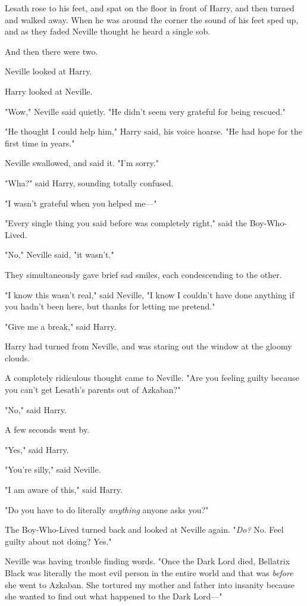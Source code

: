 Lesath rose to his feet, and spat on the floor in front of Harry, and then
turned and walked away. When he was around the corner the sound of his feet
sped up, and as they faded Neville thought he heard a single sob.

And then there were two.

Neville looked at Harry.

Harry looked at Neville.

"Wow," Neville said quietly. "He didn't seem very grateful for being rescued."

"He thought I could help him," Harry said, his voice hoarse. "He had hope for
the first time in years."

Neville swallowed, and said it. "I'm sorry."

"Wha?" said Harry, sounding totally confused.

"I wasn't grateful when you helped me\mbox{---}"

"Every single thing you said before was completely right," said the
Boy-Who-Lived.

"No," Neville said, "it wasn't."

They simultaneously gave brief sad smiles, each condescending to the other.

"I know this wasn't real," said Neville, "I know I couldn't have done anything
if you hadn't been here, but thanks for letting me pretend."

"Give me a break," said Harry.

Harry had turned from Neville, and was staring out the window at the gloomy
clouds.

A completely ridiculous thought came to Neville. "Are you feeling guilty
because you can't get Lesath's parents out of Azkaban?"

"No," said Harry.

A few seconds went by.

"Yes," said Harry.

"You're silly," said Neville.

"I am aware of this," said Harry.

"Do you have to do literally \emph{anything} anyone asks you?"

The Boy-Who-Lived turned back and looked at Neville again. "\emph{Do?} No. Feel
guilty about not doing? Yes."

Neville was having trouble finding words. "Once the Dark Lord died, Bellatrix
Black was literally the most evil person in the entire world and that was
\emph{before} she went to Azkaban. She tortured my mother and father into
insanity because she wanted to find out what happened to the Dark Lord\mbox{---}"

